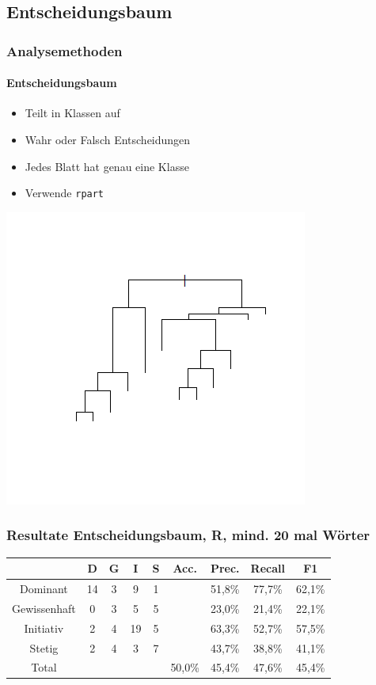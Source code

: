 \subsection{Entscheidungsbaum}
\begin{frame}
\frametitle{Analysemethoden}
\framesubtitle{Entscheidungsbaum}
\begin{itemize}\setlength\parskip{12pt}
\item Teilt in Klassen auf
\item Wahr oder Falsch Entscheidungen
\item Jedes Blatt hat genau eine Klasse
\item Verwende \texttt{rpart}
\end{itemize}
\begin{center}
	\includegraphics[scale=0.5]{RPart.png}
\end{center}
\end{frame}
\begin{frame}
\frametitle{Resultate Entscheidungsbaum, R, mind. 20 mal Wörter}
\begin{center}
\begin{tabular}{|c|c|c|c|c|c|c|c|c|}
\hline
 &  D 	& G	& I & S	& Acc.	& Prec. & Recall	& F1\\
\hline
Dominant & 14 & 3 & 9 & 1 & & 51,8\% & 77,7\% & 62,1\% \\
Gewissenhaft & 0 & 3 & 5 & 5& &23,0\% & 21,4\% & 22,1\%\\
Initiativ & 2 & 4 & 19 & 5& &63,3\% & 52,7\% & 57,5\%\\
Stetig & 2 & 4 & 3 & 7& &43,7\% & 38,8\% & 41,1\% \\
\hline
Total 	&		&		& & 		& 50,0\%	& 45,4\% & 47,6\% & 45,4\%\\
\hline
\end{tabular}
\end{center}
\end{frame}
